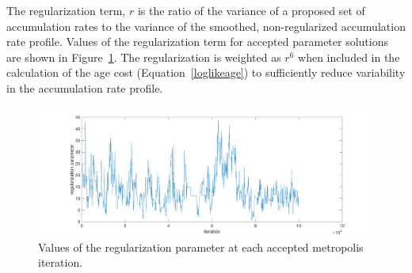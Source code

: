 The regularization term, $r$ is the ratio of the variance of a proposed set of accumulation rates to the variance of the smoothed, non-regularized accumulation rate profile. Values of the regularization term for accepted parameter solutions are shown in Figure~\ref{fig:reg}. The regularization is weighted as $r^6$ when included in the calculation of the age cost (Equation~\ref{loglikeage}) to sufficiently reduce variability in the accumulation rate profile. 


\begin{figure}[ht]
\centering
\includegraphics[scale=0.3]{../analysis/figures/regularization}
\caption[]{Values of the regularization parameter at each accepted metropolis iteration.}
\label{fig:reg}
\end{figure}